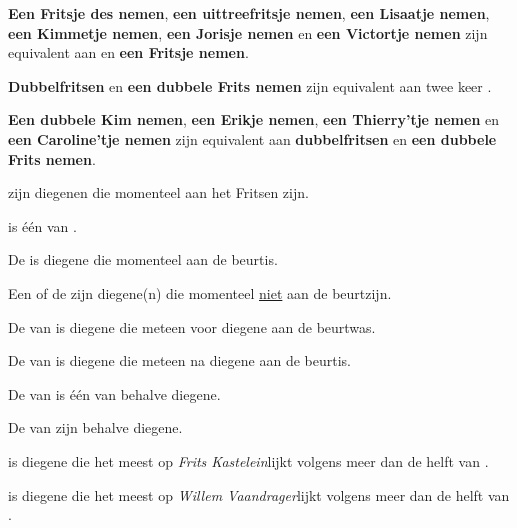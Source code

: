 \item \label{item:enkel_fritsen_equivalent}\textbf{Een Fritsje des nemen}, \textbf{een uittreefritsje nemen}, \textbf{een Lisaatje nemen}, \textbf{een Kimmetje nemen}, \textbf{een Jorisje nemen} en \textbf{een Victortje nemen}  zijn equivalent aan \Fritsen en \textbf{een Fritsje nemen}. 

\item \label{item:dubbelfritsen_equivalent} \textbf{Dubbelfritsen} en \textbf{een dubbele Frits nemen} zijn equivalent aan twee keer \FritsenN.

\item \textbf{Een dubbele Kim nemen}, \textbf{een Erikje nemen}, \textbf{een Thierry'tje nemen} en \\ \textbf{een Caroline'tje nemen} zijn equivalent aan \textbf{dubbelfritsen} en \textbf{een dubbele Frits nemen}.

\item \AlleSpelers zijn diegenen die momenteel aan het Fritsen zijn.

\item \EenSpeler is één van \alleSpelersN. 

\item De \huidigeSpeler is diegene die momenteel aan de beurt\footnotemark[1] is.  

\item Een \andereSpeler of de \andereSpelers zijn diegene(n) die momenteel \ul{niet} aan de beurt\footnotemark[1] zijn. 

\item De \vorigeSpeler van \eenSpeler is diegene die meteen voor diegene aan de beurt\footnotemark[1] was. 

\item De \volgendeSpeler van \eenSpeler is diegene die meteen na diegene aan de beurt\footnotemark[1] is. 

\item De \medeSpeler van \eenSpeler is \'e\'en van \alleSpelers behalve diegene.

\item De \medeSpelers van \eenSpeler zijn \alleSpelers behalve diegene.

\item \Frits is diegene die het meest op \textit{Frits Kastelein}\footnotemark[2] lijkt volgens meer dan de helft van \alleSpelersN\footnotemark[3].

\item \Willem is diegene die het meest op \textit{Willem Vaandrager}\footnotemark[2] lijkt volgens meer dan de helft van \alleSpelersN\footnotemark[3].

